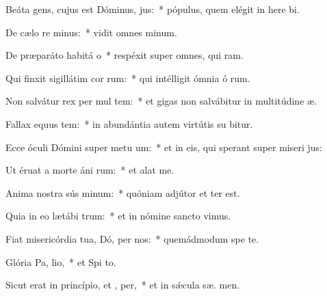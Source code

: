 \item Beáta gens, cujus est Dóminus,  jus:~* pópulus, quem elégit in here bi.
\item De cælo re minus:~* vidit omnes  minum.
\item De præparáto habitá o~* respéxit super omnes, qui  ram.
\item Qui finxit sigillátim cor rum:~* qui intélligit ómnia ó rum.
\item Non salvátur rex per mul tem:~* et gigas non salvábitur in multitúdine  æ.
\item Fallax equus  tem:~* in abundántia autem virtútis su  bitur.
\item Ecce óculi Dómini super metu um:~* et in eis, qui sperant super miseri jus:
\item Ut éruat a morte áni rum:~* et alat   me.
\item Anima nostra sús minum:~* quóniam adjútor et  ter est.
\item Quia in eo lætábi  trum:~* et in nómine sancto  vimus.
\item Fiat misericórdia tua, Dó, per nos:~* quemádmodum spe  te.
\item Glória Pa,  lio,~* et Spi to.
\item Sicut erat in princípio, et ,  per,~* et in sǽcula sæ. men.
